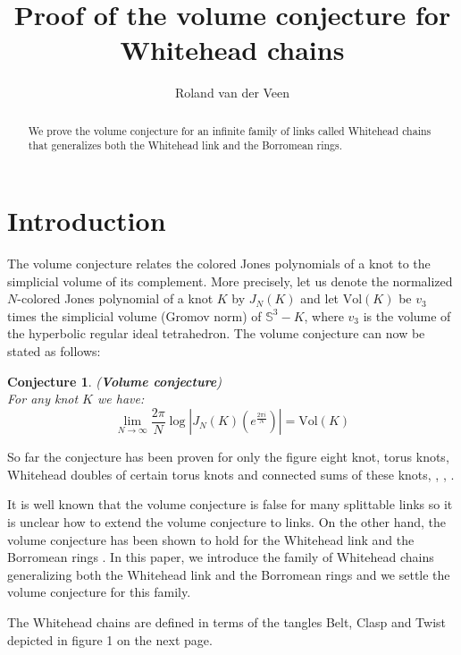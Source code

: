 \documentclass[letterpaper]{article}
\title{Proof of the volume conjecture for Whitehead chains}
\author{Roland van der Veen}
\newtheorem{conj}{Conjecture}
\begin{document}
\maketitle

\begin{abstract}
\noindent We prove the volume conjecture for an infinite family of links called
Whitehead chains that generalizes both the Whitehead link and the
Borromean rings.

\end{abstract}

\section{Introduction}

The volume conjecture relates the colored Jones polynomials of a
knot to the simplicial volume of its complement. More precisely,
let us denote the normalized $N$-colored Jones polynomial of a
knot $K$ by $J_N(K)$ and let $\mathrm{Vol}(K)$ be $v_3$ times the
simplicial volume (Gromov norm) of $\mathbb{S}^3 - K$, where $v_3$
is the volume of the hyperbolic regular ideal tetrahedron. The
volume conjecture can now be stated as follows:

\begin{conj} (\textbf{Volume conjecture}) \cite{Murakami2}\\
For any knot $K$ we have: $$\lim_{N\to\infty}\frac{2\pi}{N}\log|J_N(K)(e^{\frac{2\pi i}{N}})| = \mathrm{Vol}(K)$$
\end{conj}

\noindent So far the conjecture has been proven for only the
figure eight knot, torus knots, Whitehead doubles of certain torus
knots and connected sums of these knots, \cite{Murakamiintro},
\cite{KashaevTirkkonen}, \cite{HaoZheng}.

It is well known that the volume conjecture is false for many
splittable links so it is unclear how to extend the volume
conjecture to links. On the other hand, the volume conjecture has
been shown to hold for the Whitehead link \cite{HaoZheng} and the
Borromean rings \cite{Garoufalidis}. In this paper, we introduce
the family of Whitehead chains generalizing both the Whitehead
link and the Borromean rings and we settle the volume conjecture
for this family.

The Whitehead chains are defined in terms of the tangles Belt,
Clasp and Twist depicted in figure 1 on the next page.

\newpage
\end{document}
